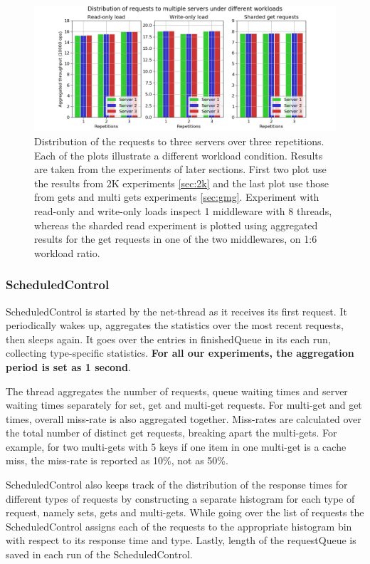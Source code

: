 \documentclass[11pt,a4paper]{article}
\begin{document}
\begin{figure}[h]
  \centering
  \includegraphics[width=1.0\linewidth,trim={0px 0px 0px 0px},clip]{img/plot/equal-load-all.png}
\caption{Distribution of the requests to three servers over three repetitions. Each of the plots illustrate a different workload condition. Results are taken from the experiments of later sections. First two plot use the results from 2K experiments \ref{sec:2k} and the last plot use those from gets and multi gets experiments \ref{sec:gmg}. Experiment with read-only and write-only loads inspect 1 middleware with 8 threads, whereas the sharded read experiment is plotted using aggregated results for the get requests in one of the two middlewares, on 1:6 workload ratio.}
\label{fig:equal-load}
\end{figure}

\subsubsection{ScheduledControl} \label{sec:ov-scheduledcontrol}
ScheduledControl is started by the net-thread as it receives its first request. It periodically wakes up, aggregates the statistics over the most recent requests, then sleeps again. It goes over the entries in finishedQueue in its each run, collecting type-specific statistics. \textbf{For all our experiments, the aggregation period is set as 1 second}.
\par The thread aggregates the number of requests, queue waiting times and server waiting times separately for set, get and multi-get requests. For multi-get and get times, overall miss-rate is also aggregated together. Miss-rates are calculated over the total number of distinct get requests, breaking apart the multi-gets. For example, for two multi-gets with 5 keys if one item in one multi-get is a cache miss, the miss-rate is reported as 10\%, not as 50\%.
\par ScheduledControl also keeps track of the distribution of the response times for different types of requests by constructing a separate histogram for each type of request, namely sets, gets and multi-gets. While going over the list of requests the ScheduledControl assigns each of the requests to the appropriate histogram bin with respect to its response time and type. Lastly, length of the requestQueue is saved in each run of the ScheduledControl.
\end{document}
